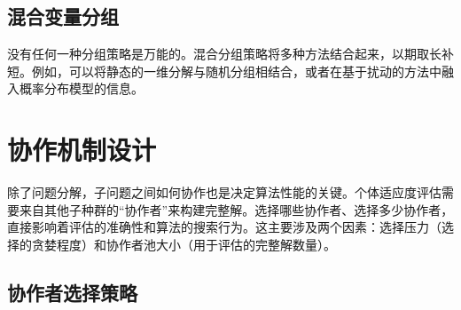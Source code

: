 \subsection{混合变量分组}
没有任何一种分组策略是万能的。混合分组策略将多种方法结合起来，以期取长补短。例如，可以将静态的一维分解与随机分组相结合，或者在基于扰动的方法中融入概率分布模型的信息。


\section{协作机制设计}

除了问题分解，子问题之间如何协作也是决定算法性能的关键。个体适应度评估需要来自其他子种群的“协作者”来构建完整解。选择哪些协作者、选择多少协作者，直接影响着评估的准确性和算法的搜索行为。这主要涉及两个因素：选择压力（选择的贪婪程度）和协作者池大小（用于评估的完整解数量）。

\subsection{协作者选择策略}
